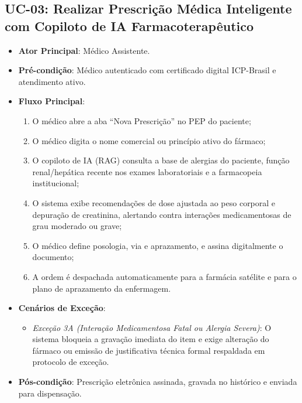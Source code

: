 \documentclass[12pt,oneside,a4paper,article]{abntex2}
\begin{document}
\subsection{UC-03: Realizar Prescrição Médica Inteligente com Copiloto de IA Farmacoterapêutico}
\begin{itemize}[noitemsep]
  \item \textbf{Ator Principal}: Médico Assistente.
  \item \textbf{Pré-condição}: Médico autenticado com certificado digital ICP-Brasil e atendimento ativo.
  \item \textbf{Fluxo Principal}:
  \begin{enumerate}[noitemsep]
    \item O médico abre a aba ``Nova Prescrição'' no PEP do paciente;
    \item O médico digita o nome comercial ou princípio ativo do fármaco;
    \item O copiloto de IA (RAG) consulta a base de alergias do paciente, função renal/hepática recente nos exames laboratoriais e a farmacopeia institucional;
    \item O sistema exibe recomendações de dose ajustada ao peso corporal e depuração de creatinina, alertando contra interações medicamentosas de grau moderado ou grave;
    \item O médico define posologia, via e aprazamento, e assina digitalmente o documento;
    \item A ordem é despachada automaticamente para a farmácia satélite e para o plano de aprazamento da enfermagem.
  \end{enumerate}
  \item \textbf{Cenários de Exceção}:
  \begin{itemize}[noitemsep]
    \item \textit{Exceção 3A (Interação Medicamentosa Fatal ou Alergia Severa)}: O sistema bloqueia a gravação imediata do item e exige alteração do fármaco ou emissão de justificativa técnica formal respaldada em protocolo de exceção.
  \end{itemize}
  \item \textbf{Pós-condição}: Prescrição eletrônica assinada, gravada no histórico e enviada para dispensação.
\end{itemize}
\end{document}
